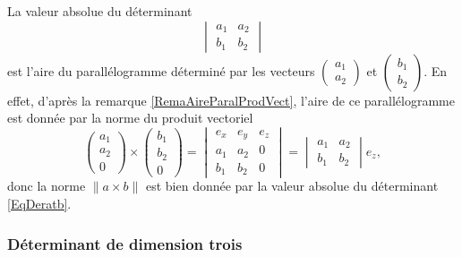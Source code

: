 La valeur absolue du déterminant 
\begin{equation}        \label{EqDeratb}
    \begin{vmatrix}
        a_1    &   a_2    \\ 
        b_1    &   b_2    
    \end{vmatrix}
\end{equation}
est l'aire du parallélogramme déterminé par les vecteurs $\begin{pmatrix}
    a_1    \\ 
    a_2    
\end{pmatrix}$ et $\begin{pmatrix}
    b_1    \\ 
    b_2    
\end{pmatrix}$. En effet, d'après la remarque \ref{RemaAireParalProdVect}, l'aire de ce parallélogramme est donnée par la norme du produit vectoriel
\begin{equation}
    \begin{pmatrix}
        a_1    \\ 
        a_2    \\ 
        0    
    \end{pmatrix}\times
    \begin{pmatrix}
          b_1  \\ 
        b_2    \\ 
        0    
    \end{pmatrix}=\begin{vmatrix}
        e_x    &   e_y    &   e_z    \\
        a_1    &   a_2    &   0    \\
        b_1    &   b_2    &   0
    \end{vmatrix}=
    \begin{vmatrix}
        a_1    &   a_2    \\ 
        b_1    &   b_2    
    \end{vmatrix}e_z,
\end{equation}
donc la norme $\| a\times b \|$ est bien donnée par la valeur absolue du déterminant \eqref{EqDeratb}.

\subsubsection{Déterminant de dimension trois}

